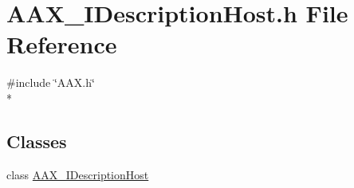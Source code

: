 \hypertarget{a00240}{}\section{A\+A\+X\+\_\+\+I\+Description\+Host.\+h File Reference}
\label{a00240}
{\ttfamily \#include \char`\"{}A\+A\+X.\+h\char`\"{}}\\*
\subsection*{Classes}
\begin{DoxyCompactItemize}
\item 
class \hyperlink{a00091}{A\+A\+X\+\_\+\+I\+Description\+Host}
\end{DoxyCompactItemize}
